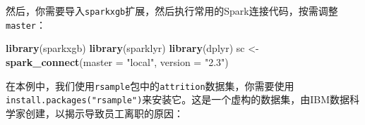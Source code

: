 \documentclass[
]{article}
\newenvironment{Shaded}{\begin{snugshade}}{\end{snugshade}}
\newcommand{\DataTypeTok}[1]{\textcolor[rgb]{0.13,0.29,0.53}{#1}}
\newcommand{\KeywordTok}[1]{\textcolor[rgb]{0.13,0.29,0.53}{\textbf{#1}}}
\newcommand{\NormalTok}[1]{#1}
\newcommand{\StringTok}[1]{\textcolor[rgb]{0.31,0.60,0.02}{#1}}
\begin{document}
然后，你需要导入\texttt{sparkxgb}扩展，然后执行常用的Spark连接代码，按需调整\texttt{master}：

\begin{Shaded}
\begin{Highlighting}[]
\KeywordTok{library}\NormalTok{(sparkxgb)}
\KeywordTok{library}\NormalTok{(sparklyr)}
\KeywordTok{library}\NormalTok{(dplyr)}
\NormalTok{sc <-}\StringTok{ }\KeywordTok{spark_connect}\NormalTok{(}\DataTypeTok{master =} \StringTok{"local"}\NormalTok{, }\DataTypeTok{version =} \StringTok{"2.3"}\NormalTok{)}
\end{Highlighting}
\end{Shaded}

在本例中，我们使用\texttt{rsample}包中的\texttt{attrition}数据集，你需要使用\texttt{install.packages("rsample")}来安装它。这是一个虚构的数据集，由IBM数据科学家创建，以揭示导致员工离职的原因：
\end{document}
